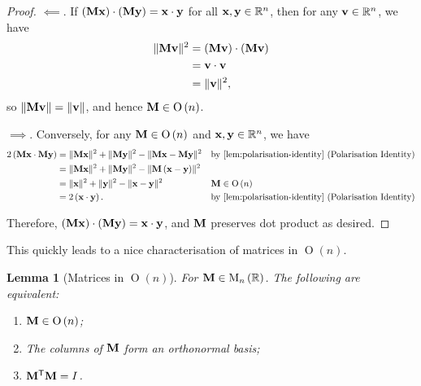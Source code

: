 \documentclass{article}
\newtheorem{lemma}[theorem]{Lemma}
\theoremstyle{definition}
\theoremstyle{remark}
\newcommand{\pqty}[1]{\left(#1\right)}
\newcommand{\transpose}{^{\mathsf{T}}}
\newcommand{\RR}{\mathbb{R}}
\DeclarePairedDelimiter{\norm}{\lVert}{\rVert}
\newcommand{\identityM}{I}
\newcommand{\matrixset}{\mathrm{M}}
\newcommand{\Or}{\operatorname{O}}
\begin{document}
\begin{proof}
    \(\impliedby\). If \(\pqty{\vb{Mx}} \cdot \pqty{\vb{My}} = \vb{x} \cdot \vb{y}\) for all \(\vb{x}, \vb{y} \in \RR^n\), then for any \(\vb{v} \in \RR^n\), we have
    \begin{align*}
        \norm{\vb{Mv}}^2 &= \pqty{\vb{Mv}} \cdot \pqty{\vb{Mv}} \\
        &=\vb{v} \cdot \vb{v} \\
        &= \norm{\vb{v}}^2,
    \end{align*}
    so \(\norm{\vb{Mv}} = \norm{\vb{v}}\), and hence \(\vb{M} \in \Or\pqty{n}\).

    \(\implies\). Conversely, for any \(\vb{M} \in \Or\pqty{n}\) and \(\vb{x}, \vb{y} \in \RR^n\), we have
    \begin{align*}
        2 \pqty{\vb{Mx} \cdot \vb{My}} &= \norm{\vb{Mx}}^2 + \norm{\vb{My}}^2 - \norm{\vb{Mx} - \vb{My}}^2 && \text{by \autoref{lem:polarisation-identity} (Polarisation Identity)} \\
        &= \norm{\vb{Mx}}^2 + \norm{\vb{My}}^2 - \norm{\vb{M} \pqty{\vb{x} - \vb{y}}}^2 \\
        &= \norm{\vb{x}}^2 + \norm{\vb{y}}^2 - \norm{\vb{x} - \vb{y}}^2 && \vb{M} \in \Or\pqty{n} \\
        &= 2 \pqty{\vb{x} \cdot \vb{y}}. && \text{by \autoref{lem:polarisation-identity} (Polarisation Identity)}
    \end{align*}

    Therefore, \(\pqty{\vb{Mx}} \cdot \pqty{\vb{My}} = \vb{x} \cdot \vb{y}\), and \(\vb{M}\) preserves dot product as desired.
\end{proof}

This quickly leads to a nice characterisation of matrices in \(\Or\pqty{n}\).

\begin{lemma}[Matrices in \(\Or\pqty{n}\)]
    \label{lem:orthogonal-matrices-orthonormal-transpose}%
    For \(\vb{M} \in \matrixset_n \pqty{\RR}\). The following are equivalent:
    \begin{enumerate}
        \item \(\vb{M} \in \Or\pqty{n}\);
        \item The columns of \(\vb{M}\) form an orthonormal basis;
        \item \(\vb{M}\transpose \vb{M} = \identityM\).
    \end{enumerate}
\end{lemma}
\end{document}
